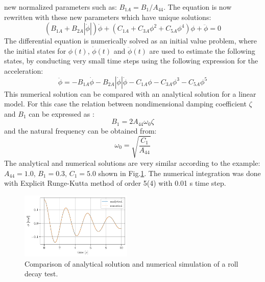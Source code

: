 new normalized parameters such as: $B_{1A} = B_1/A_{44}$. The equation
is now rewritten with these new parameters which have unique solutions:
\begin{equation}
\left(B_{1A} + B_{2A} \left|{\dot{\phi}}\right|\right) \dot{\phi} + \left(C_{1A} + C_{3A} \phi^{2} + C_{5A} \phi^{4}\right) \phi + \ddot{\phi} = 0
\label{eq:roll_decay_equation_quadratic_A}
\end{equation}
The differential equation is numerically solved as an initial value
problem, where the initial states for $\phi(t)$, $\dot{\phi}(t)$ and
$\ddot{\phi}(t)$ are used to estimate the following states, by
conducting very small time steps using the following expression for the
acceleration:
\begin{equation}
\ddot{\phi} = - B_{1A} \dot{\phi} - B_{2A} \left|{\dot{\phi}}\right| \dot{\phi} - C_{1A} \phi - C_{3A} \phi^{3} - C_{5A} \phi^{5}
\label{eq:eq_phi1d}
\end{equation}
This numerical solution can be compared with an analytical solution
\citep{7505983/KL7A3RIV} for a linear model.
For this
case the relation between nondimensional damping coefficient $\zeta$
and $B_1$ can be expressed as \citep{7505983/FB64RGPF}:
\begin{equation}
B_{1} = 2 A_{44} \omega_{0} \zeta
\label{eq:b_1_zeta_eq}
\end{equation}
and the natural frequency can be obtained from:
\begin{equation}
\omega_{0} = \sqrt{\frac{C_{1}}{A_{44}}}
\label{eq:omega0_eq}
\end{equation}
The analytical and numerical solutions are very similar according to the
example: $A_{44} = 1.0$, $B_1 = 0.3$, $C_1 = 5.0$ shown in
Fig.\ref{fig:analytical_numerical}. The numerical integration
was done with Explicit Runge-Kutta method of order 5(4) with 0.01 s time
step.
\begin{figure}[H]
\begin{center}\includegraphics[width = 0.475\textwidth]{figures/analytical_numerical.pdf}\end{center}
\vspace{-0.7cm}
\caption{Comparison of analytical solution and numerical simulation of a roll decay test.}
\label{fig:analytical_numerical}
\end{figure}
